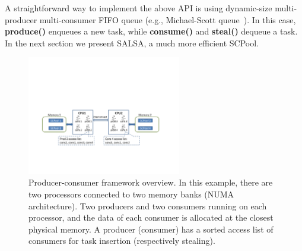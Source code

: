 A straightforward way to implement the above API is using dynamic-size multi-producer multi-consumer FIFO queue (e.g., Michael-Scott queue~\cite{Michael:1996:SFP:248052.248106}).
In this case, {\bf produce()} enqueues a new task, while {\bf consume()} and {\bf steal()} dequeue a task. In the next section we present SALSA, a much more efficient SCPool.


\begin{figure}[htb]
	\centering
	\includegraphics[width=0.6\textwidth]{figures/system-fig}
	\caption{\footnotesize{Producer-consumer framework overview. In this example, there are two processors connected to two memory banks (NUMA architecture). Two producers and two consumers running on each processor, and the data of each consumer is allocated at the closest physical memory. A producer (consumer) has a sorted access list of consumers for task insertion (respectively stealing). }}
	\vspace{-10pt}
	\label{fig:system-fig}
\end{figure}

